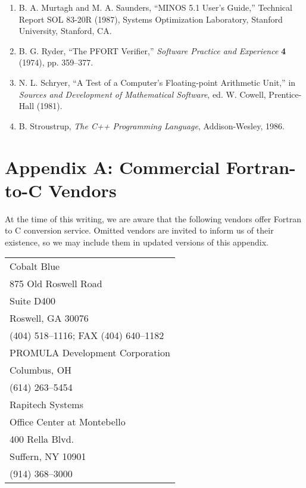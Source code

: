 \documentclass[12pt]{article}
\begin{document}
\begin{enumerate}
\item B. A. Murtagh and M. A. Saunders, ``MINOS 5.1 User's Guide,'' Technical Report SOL 83-20R (1987), Systems Optimization Laboratory, Stanford University, Stanford, CA.

\item B. G. Ryder, ``The PFORT Verifier,'' \emph{Software Practice and Experience} \textbf{4} (1974), pp. 359--377.

\item N. L. Schryer, ``A Test of a Computer's Floating-point Arithmetic Unit,'' in \emph{Sources and Development of Mathematical Software}, ed. W. Cowell, Prentice-Hall (1981).

\item B. Stroustrup, \emph{The C++ Programming Language}, Addison-Wesley, 1986.
\end{enumerate}

\section*{Appendix A: Commercial Fortran-to-C Vendors}

At the time of this writing, we are aware that the following vendors offer Fortran to C conversion service. Omitted vendors are invited to inform us of their existence, so we may include them in updated versions of this appendix.

\begin{center}
\begin{tabular}{l}
Cobalt Blue\\
875 Old Roswell Road\\
Suite D400\\
Roswell, GA 30076\\
(404) 518–1116; FAX (404) 640–1182
\\[4ex]
PROMULA Development Corporation\\
Columbus, OH\\
(614) 263–5454
\\[4ex]
Rapitech Systems\\
Office Center at Montebello\\
400 Rella Blvd.\\
Suffern, NY 10901\\
(914) 368–3000
\end{tabular}
\end{center}
\end{document}
